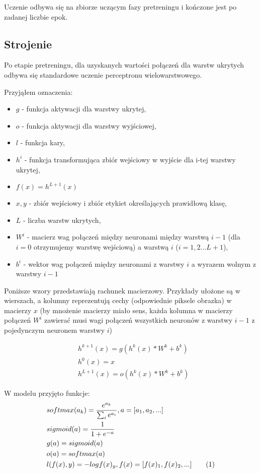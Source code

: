 \documentclass[fleqn]{scrartcl}
\newcommand\numberthis{\addtocounter{equation}{1}\tag{\theequation}}
\begin{document}
Uczenie odbywa się na zbiorze uczącym fazy pretreningu i kończone jest po zadanej liczbie epok.





\subsection{Strojenie}
Po etapie pretreningu, dla uzyskanych wartości połączeń dla warstw ukrytych odbywa się standardowe uczenie perceptronu wielowarstwowego. 

Przyjąłem oznaczenia:
\begin{itemize}
  \item $g$ - funkcja aktywacji dla warstwy ukrytej,
  \item $o$ - funkcja aktywacji dla warstwy wyjściowej,
  \item $l$ - funkcja kary,
  \item $h^{i}$ - funkcja transformująca zbiór wejściowy w wyjście dla i-tej warstwy ukrytej,
  \item $f(x) = h^{L+1}(x)$
  \item $x,y$ - zbiór wejściowy i zbiór etykiet określających prawidłową klasę,
  \item $L$ - liczba warstw ukrytych,
  \item $W^{i}$ - macierz wag połączeń między neuronami między warstwą $i-1$ 
      (dla $i=0$ otrzymujemy warstwę wejściową) a warstwą $i$ ($i = 1,2 ...
      L+1$),
  \item $b^{i}$ - wektor wag połączeń między neuronami z warstwy $i$ a wyrazem 
      wolnym z warstwy $i-1$
\end{itemize}

Poniższe wzory przedstawiają rachunek macierzowy. Przykłady ułożone są w wierszach, a kolumny reprezentują cechy (odpowiednie piksele obrazka) w macierzy $x$ (by mnożenie macierzy miało sens, każda kolumna w macierzy połączeń $W^{i}$ zawierać musi wagi połączeń wszystkich neuronów z warstwy $i-1$ z pojedynczym neuronem warstwy $i$)

\begin{align*}
    &h^{k+1}(x) = g(h^{k}(x)*W^{k}+b^{k})    \\
    &h^{0}(x) = x                            \\
    &h^{L+1}(x) = o(h^{k}(x)*W^{k}+b^{k})
\end{align*}

W modelu przyjęto funkcje:
\begin{align*}
    &softmax(a_{k}) = \frac {e^{a_{k}}} {\sum_{i} e^{a_{i}}}, a = [a_{1}, a_{2}, ...] \\
    &sigmoid(a) = \frac{1}{1+e^{-a}}        \\
	&g(a) = sigmoid(a)						\\
	&o(a) = softmax(a)						\\
	&l(f(x), y)= -log f(x)_{y},  f(x) = [f(x)_{1}, f(x)_{2}, ...]\numberthis \label{eq:3}
\end{align*}
\end{document}
